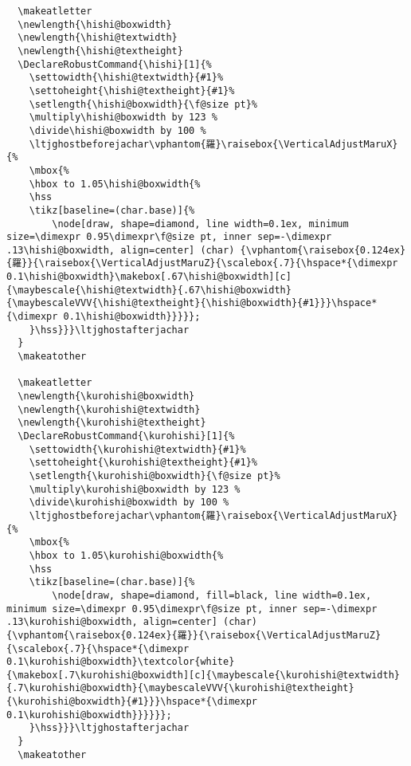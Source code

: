 \documentclass[luatex,fontsize=10pt,paper=b5,twoside]{jlreq}%
\begin{document}
\begin{lstlisting}
  \makeatletter
  \newlength{\hishi@boxwidth}
  \newlength{\hishi@textwidth}
  \newlength{\hishi@textheight}
  \DeclareRobustCommand{\hishi}[1]{%
    \settowidth{\hishi@textwidth}{#1}%
    \settoheight{\hishi@textheight}{#1}%
    \setlength{\hishi@boxwidth}{\f@size pt}%
    \multiply\hishi@boxwidth by 123 %
    \divide\hishi@boxwidth by 100 %
    \ltjghostbeforejachar\vphantom{羅}\raisebox{\VerticalAdjustMaruX}{%
    \mbox{%
    \hbox to 1.05\hishi@boxwidth{%
    \hss
    \tikz[baseline=(char.base)]{%
        \node[draw, shape=diamond, line width=0.1ex, minimum size=\dimexpr 0.95\dimexpr\f@size pt, inner sep=-\dimexpr .13\hishi@boxwidth, align=center] (char) {\vphantom{\raisebox{0.124ex}{羅}}{\raisebox{\VerticalAdjustMaruZ}{\scalebox{.7}{\hspace*{\dimexpr 0.1\hishi@boxwidth}\makebox[.67\hishi@boxwidth][c]{\maybescale{\hishi@textwidth}{.67\hishi@boxwidth}{\maybescaleVVV{\hishi@textheight}{\hishi@boxwidth}{#1}}}\hspace*{\dimexpr 0.1\hishi@boxwidth}}}}};
    }\hss}}}\ltjghostafterjachar
  }
  \makeatother

  \makeatletter
  \newlength{\kurohishi@boxwidth}
  \newlength{\kurohishi@textwidth}
  \newlength{\kurohishi@textheight}
  \DeclareRobustCommand{\kurohishi}[1]{%
    \settowidth{\kurohishi@textwidth}{#1}%
    \settoheight{\kurohishi@textheight}{#1}%
    \setlength{\kurohishi@boxwidth}{\f@size pt}%
    \multiply\kurohishi@boxwidth by 123 %
    \divide\kurohishi@boxwidth by 100 %
    \ltjghostbeforejachar\vphantom{羅}\raisebox{\VerticalAdjustMaruX}{%
    \mbox{%
    \hbox to 1.05\kurohishi@boxwidth{%
    \hss
    \tikz[baseline=(char.base)]{%
        \node[draw, shape=diamond, fill=black, line width=0.1ex, minimum size=\dimexpr 0.95\dimexpr\f@size pt, inner sep=-\dimexpr .13\kurohishi@boxwidth, align=center] (char) {\vphantom{\raisebox{0.124ex}{羅}}{\raisebox{\VerticalAdjustMaruZ}{\scalebox{.7}{\hspace*{\dimexpr 0.1\kurohishi@boxwidth}\textcolor{white}{\makebox[.7\kurohishi@boxwidth][c]{\maybescale{\kurohishi@textwidth}{.7\kurohishi@boxwidth}{\maybescaleVVV{\kurohishi@textheight}{\kurohishi@boxwidth}{#1}}}\hspace*{\dimexpr 0.1\kurohishi@boxwidth}}}}}};
    }\hss}}}\ltjghostafterjachar
  }
  \makeatother


\end{lstlisting}
\end{document}
